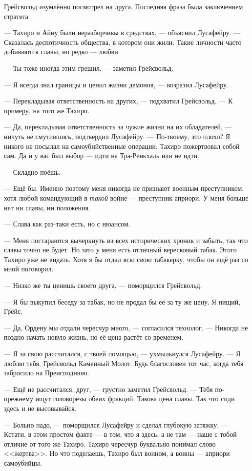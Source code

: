 Грейсвольд изумлённо посмотрел на друга.
Последняя фраза была заключением стратега.

--- Тахиро и Айну были неразборчивы в средствах, --- объяснил Лусафейру.
--- Сказалась деспотичность общества, в котором они жили.
Такие личности часто добиваются славы, но редко --- любви.

--- Ты тоже иногда этим грешил, --- заметил Грейсвольд.

--- Я всегда знал границы и ценил жизни демонов, --- возразил Лусафейру.

--- Перекладывая ответственность на других, --- подхватил Грейсвольд.
--- К примеру, на того же Тахиро.

--- Да, перекладывая ответственность за чужие жизни на их обладателей, --- ничуть не смутившись, подтвердил Лусафейру.
--- По-твоему, это плохо?
Я никого не посылал на самоубийственные операции.
Тахиро пожертвовал собой сам.
Да и у вас был выбор --- идти на Тра-Ренкхаль или не идти.

--- Складно поёшь.

--- Ещё бы.
Именно поэтому меня никогда не признают военным преступником, хотя любой командующий в \emph{такой} войне --- преступник априори.
У меня больше нет ни славы, ни положения.

--- Слава как раз-таки есть, но с нюансом.

--- Меня постараются вычеркнуть из всех исторических хроник и забыть, так что славы точно не будет.
Но зато у меня есть отличный вересковый табак.
Этого Тахиро уже не видать.
Хотя я бы отдал всю свою табакерку, чтобы он ещё раз со мной поговорил.

--- Низко же ты ценишь своего друга, --- поморщился Грейсвольд.

--- Я бы выкупил беседу за табак, но не продал бы её за ту же цену.
Я нищий, Грейс.

--- Да, Ордену мы отдали чересчур много, --- согласился технолог.
--- Никогда не поздно начать новую жизнь, но её цена растёт со временем.

--- Я за свою рассчитался, с твоей помощью, --- ухмыльнулся Лусафейру.
--- Я люблю тебя, Грейсвольд Каменный Молот.
Будь благословен тот час, когда тебя забросило на Преисподнюю.

--- Ещё не рассчитался, друг, --- грустно заметил Грейсвольд.
--- Тебя по-прежнему ищут головорезы обеих фракций.
Такова цена славы.
Так что сиди здесь и не высовывайся.

--- Больно надо, --- поморщился Лусафейру и сделал глубокую затяжку.
--- Кстати, в этом простом факте --- в том, что я здесь, а не там --- наше с тобой отличие от того же Тахиро.
Тахиро чересчур буквально понимал слово <<жертва>>.
Но что поделаешь, Тахиро был воином, а воины --- априори самоубийцы.

